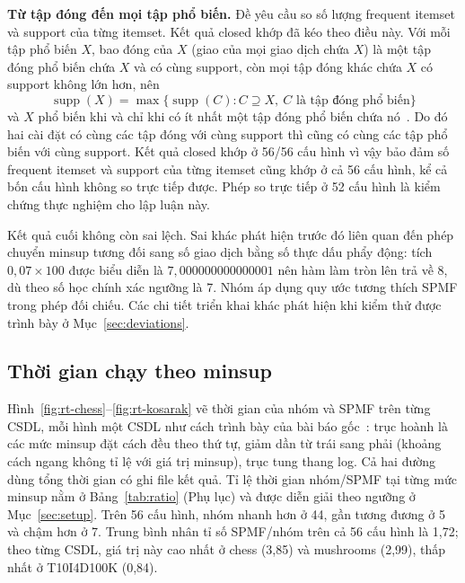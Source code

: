 \textbf{Từ tập đóng đến mọi tập phổ biến.} Đề yêu cầu so số lượng frequent itemset và support của từng itemset. Kết
quả closed khớp đã kéo theo điều này. Với mỗi tập phổ biến $X$, bao đóng của $X$ (giao của mọi giao dịch chứa $X$) là
một tập đóng phổ biến chứa $X$ và có cùng support, còn mọi tập đóng khác chứa $X$ có support không lớn hơn, nên
\begin{equation}
\operatorname{supp}(X)=\max\{\operatorname{supp}(C) : C \supseteq X,\ C \text{ là tập đóng phổ biến}\}
\end{equation}
và $X$ phổ biến khi và chỉ khi có ít nhất một tập đóng phổ biến chứa nó~\cite{pasquier1999}. Do đó hai cài đặt có
cùng các tập đóng với cùng support thì cũng có cùng các tập phổ biến với cùng support. Kết quả closed khớp ở 56/56 cấu
hình vì vậy bảo đảm số frequent itemset và support của từng itemset cũng khớp ở cả 56 cấu hình, kể cả bốn cấu hình
không so trực tiếp được. Phép so trực tiếp ở 52 cấu hình là kiểm chứng thực nghiệm cho lập luận này.

\begin{table}[!t]
\caption{Tỉ lệ itemset khớp SPMF theo từng CSDL (closed: mọi mức minsup, mọi frequent itemset: các mức có không quá
2 triệu frequent itemset). Số itemset là tổng cộng dồn qua các mức minsup được so, không phải số tại từng ngưỡng; số
theo từng ngưỡng ở Hình~\ref{fig:itemsets}}
\label{tab:correctness}
\centering
{}
\end{table}

Kết quả cuối không còn sai lệch. Sai khác phát hiện trước đó liên quan đến phép chuyển minsup tương đối sang số giao
dịch bằng số thực dấu phẩy động: tích $0{,}07 \times 100$ được biểu diễn là $7{,}000000000000001$ nên hàm làm tròn lên
trả về 8, dù theo số học chính xác ngưỡng là 7. Nhóm áp dụng quy ước tương thích SPMF trong phép đối chiếu. Các chi
tiết triển khai khác phát hiện khi kiểm thử được trình bày ở Mục~\ref{sec:deviations}.

\subsection{Thời gian chạy theo minsup}
\label{sec:runtime}

Hình~\ref{fig:rt-chess}–\ref{fig:rt-kosarak} vẽ thời gian của nhóm và SPMF trên từng CSDL, mỗi hình một CSDL như
cách trình bày của bài báo gốc~\cite{grahne2005}: trục hoành là các mức minsup đặt cách đều theo thứ tự, giảm dần từ
trái sang phải (khoảng cách ngang không tỉ lệ với giá trị minsup), trục tung thang log. Cả hai đường dùng tổng thời
gian có ghi file kết quả. Tỉ lệ thời gian nhóm/SPMF tại từng mức minsup nằm ở Bảng~\ref{tab:ratio} (Phụ lục) và được
diễn giải theo ngưỡng ở Mục~\ref{sec:setup}. Trên 56 cấu hình, nhóm nhanh hơn ở 44, gần tương đương ở 5 và chậm hơn
ở 7. Trung bình nhân tỉ số SPMF/nhóm trên cả 56 cấu hình là 1{,}72; theo từng CSDL, giá trị này cao nhất ở chess
(3{,}85) và mushrooms (2{,}99), thấp nhất ở T10I4D100K (0{,}84).

